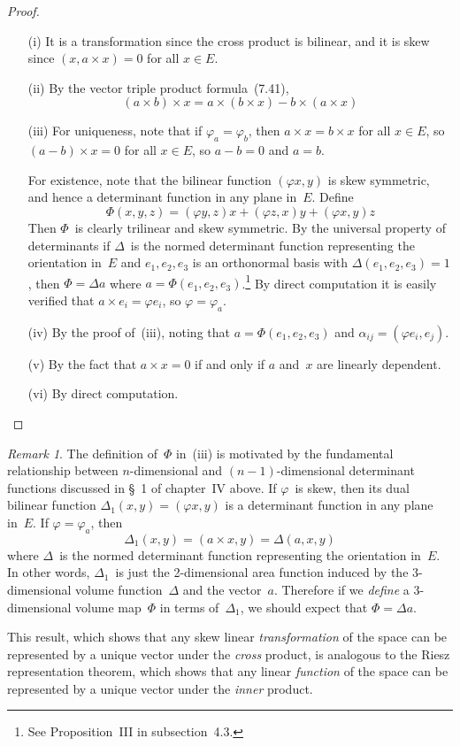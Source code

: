 \documentclass[letterpaper,12pt]{article}
\newcommand{\cross}{\times}
\newcommand{\iprod}[2]{(#1,#2)}
\theoremstyle{definition}
\theoremstyle{remark}
\newtheorem*{rmk}{Remark}
\begin{document}
\begin{proof}\
\begin{enumerate}
\item[(i)] It is a transformation since the cross product is bilinear, and it is skew since \(\iprod{x}{a\cross x}=0\) for all \(x\in E\).
\item[(ii)] By the vector triple product formula~(7.41),
\[(a\cross b)\cross x=a\cross(b\cross x)-b\cross(a\cross x)\]
\item[(iii)] For uniqueness, note that if \(\varphi_a=\varphi_b\), then \(a\cross x=b\cross x\) for all \(x\in E\), so \((a-b)\cross x=0\) for all \(x\in E\), so \(a-b=0\) and \(a=b\).

For existence, note that the bilinear function \(\iprod{\varphi x}{y}\) is skew symmetric, and hence a determinant function in any plane in~\(E\). Define
\[\Phi(x,y,z)=\iprod{\varphi y}{z}x+\iprod{\varphi z}{x}y+\iprod{\varphi x}{y}z\]
Then \(\Phi\)~is clearly trilinear and skew symmetric. By the universal property of determinants if \(\Delta\)~is the normed determinant function representing the orientation in~\(E\) and \(e_1,e_2,e_3\) is an orthonormal basis with \(\Delta(e_1,e_2,e_3)=1\), then \(\Phi=\Delta a\) where \(a=\Phi(e_1,e_2,e_3)\).\footnote{See Proposition~III in subsection~4.3.} By direct computation it is easily verified that \(a\cross e_i=\varphi e_i\), so \(\varphi=\varphi_a\).
\item[(iv)] By the proof of~(iii), noting that \(a=\Phi(e_1,e_2,e_3)\) and \(\alpha_{ij}=\iprod{\varphi e_i}{e_j}\).
\item[(v)] By the fact that \(a\cross x=0\) if and only if \(a\) and~\(x\) are linearly dependent.
\item[(vi)] By direct computation.\qedhere
\end{enumerate}
\end{proof}
\begin{rmk}
The definition of~\(\Phi\) in~(iii) is motivated by the fundamental relationship between \(n\)-dimensional and \((n-1)\)-dimensional determinant functions discussed in \S~1 of chapter~IV above. If \(\varphi\)~is skew, then its dual bilinear function \(\Delta_1(x,y)=\iprod{\varphi x}{y}\) is a determinant function in any plane in~\(E\). If \(\varphi=\varphi_a\), then
\[\Delta_1(x,y)=\iprod{a\cross x}{y}=\Delta(a,x,y)\]
where \(\Delta\)~is the normed determinant function representing the orientation in~\(E\). In other words, \(\Delta_1\)~is just the 2-dimensional area function induced by the 3-dimensional volume function~\(\Delta\) and the vector~\(a\). Therefore if we \emph{define} a 3-dimensional volume map~\(\Phi\) in terms of~\(\Delta_1\), we should expect that \(\Phi=\Delta a\).

This result, which shows that any skew linear \emph{transformation} of the space can be represented by a unique vector under the \emph{cross} product, is analogous to the Riesz representation theorem, which shows that any linear \emph{function} of the space can be represented by a unique vector under the \emph{inner} product.
\end{rmk}
\end{document}
